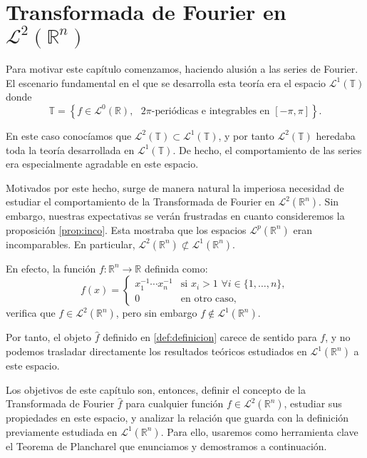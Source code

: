 \chapter{Transformada de Fourier en  $\mathscr{L}^2(\mathbb{R}^n)$}

\noindent Para motivar este capítulo comenzamos, haciendo alusión a las series de Fourier.  
El escenario fundamental en el que se desarrolla esta teoría era el espacio $\mathscr{L}^1(\mathbb{T})$ donde 
\begin{equation}
    \mathbb{T} = \left\{ f \in \mathscr{L}^0(\mathbb{R}), \text{ $2\pi$-periódicas e integrables en } [-\pi,\pi] \right\}.
\end{equation}

\noindent En este caso conocíamos que $\mathscr{L}^2(\mathbb{T}) \subset \mathscr{L}^1(\mathbb{T})$, y por tanto $\mathscr{L}^2(\mathbb{T})$ heredaba toda la teoría desarrollada en $\mathscr{L}^1(\mathbb{T})$. De hecho, el comportamiento de las series era especialmente agradable en este espacio.

\noindent Motivados por este hecho, surge de manera natural la imperiosa necesidad de estudiar el comportamiento de la Transformada de Fourier en $\mathscr{L}^2(\mathbb{R}^n)$. Sin embargo, nuestras expectativas se verán frustradas en cuanto consideremos la proposición \ref{prop:inco}. Esta mostraba que los espacios $\mathscr{L}^p(\mathbb{R}^n)$ eran incomparables. En particular, $\mathscr{L}^2(\mathbb{R}^n) \not\subset \mathscr{L}^1(\mathbb{R}^n)$.
\vspace{0.1cm}

\noindent En efecto, la función $f: \mathbb{R}^n \rightarrow \mathbb{R} $ definida como: 
\begin{equation}
    f(x) = \begin{cases} 
      x_1^{-1} \cdots x_n^{-1} & \text{si } x_i > 1 \, \, \forall i \in \{1,\ldots,n\}, \\
      0 & \text{en otro caso} ,
   \end{cases}
\end{equation}
verifica que $f \in \mathscr{L}^2(\mathbb{R}^n)$, pero sin embargo $f \notin \mathscr{L}^1(\mathbb{R}^n)$.

 \noindent Por tanto, el objeto $\widehat{f}$ definido en \ref{def:definicion} carece de sentido para $f$, y no podemos trasladar directamente los resultados teóricos estudiados en $\mathscr{L}^1(\mathbb{R}^n)$ a este espacio. 

\noindent Los objetivos de este capítulo son, entonces, definir el concepto de la Transformada de Fourier $\widehat{f}$ para cualquier función $f \in  \mathscr{L}^2(\mathbb{R}^n)$, estudiar sus propiedades en este espacio, y analizar la relación que guarda con la definición previamente estudiada en $\mathscr{L}^1(\mathbb{R}^n)$. Para ello, usaremos como herramienta clave el Teorema de Plancharel que enunciamos y demostramos a continuación.


